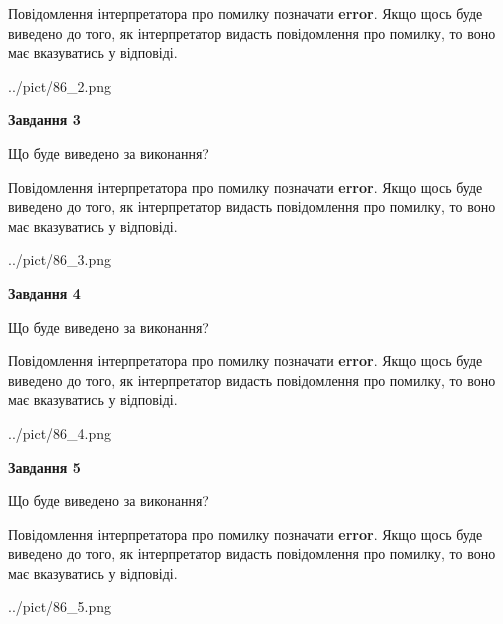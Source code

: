 \documentclass[12pt, ukrainian]{article}
\begin{document}
{\begin {large}
Повідомлення інтерпретатора про помилку позначати \textbf{error}.
Якщо щось буде виведено до того, як інтерпретатор видасть повідомлення про помилку, 
то воно має вказуватись у відповіді. \par


\begin{center}
	{../pict/86_2.png}
\end{center}
\newpage

{\begin {center}\textbf{Завдання 3}\end {center}}\par
Що буде виведено за виконання?

Повідомлення інтерпретатора про помилку позначати \textbf{error}.
Якщо щось буде виведено до того, як інтерпретатор видасть повідомлення про помилку, 
то воно має вказуватись у відповіді. \par


\begin{center}
	{../pict/86_3.png}
\end{center}
\newpage

{\begin {center}\textbf{Завдання 4}\end {center}}\par
Що буде виведено за виконання?

Повідомлення інтерпретатора про помилку позначати \textbf{error}.
Якщо щось буде виведено до того, як інтерпретатор видасть повідомлення про помилку, 
то воно має вказуватись у відповіді. \par


\begin{center}
	{../pict/86_4.png}
\end{center}
\newpage

{\begin {center}\textbf{Завдання 5}\end {center}}\par
Що буде виведено за виконання?

Повідомлення інтерпретатора про помилку позначати \textbf{error}.
Якщо щось буде виведено до того, як інтерпретатор видасть повідомлення про помилку, 
то воно має вказуватись у відповіді. \par


\begin{center}
	{../pict/86_5.png}
\end{center}
\newpage


\end{large}}
\end{document}
